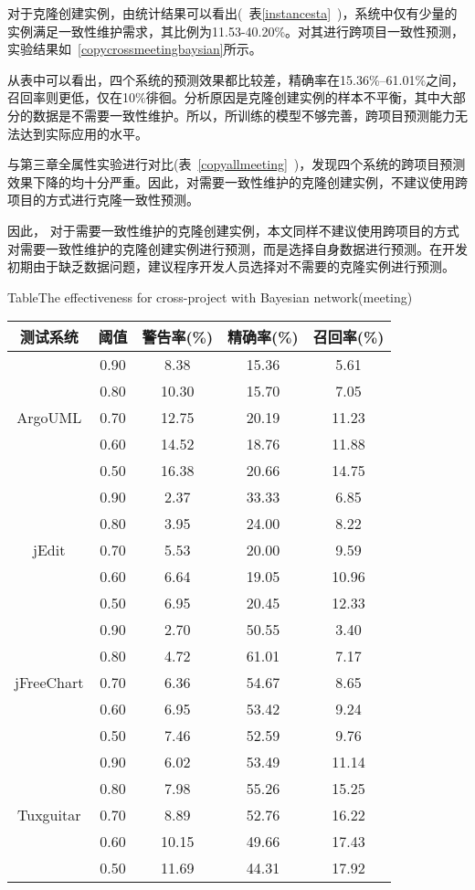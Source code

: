 对于克隆创建实例，由统计结果可以看出(~表\ref{instancesta}~)，系统中仅有少量的实例满足一致性维护需求，其比例为11.53-40.20\%。对其进行跨项目一致性预测，实验结果如~\ref{copycrossmeetingbaysian}所示。

从表中可以看出，四个系统的预测效果都比较差，精确率在15.36\%--61.01\%之间，召回率则更低，仅在10\%徘徊。分析原因是克隆创建实例的样本不平衡，其中大部分的数据是不需要一致性维护。所以，所训练的模型不够完善，跨项目预测能力无法达到实际应用的水平。

与第三章全属性实验进行对比(表~\ref{copyallmeeting}~)，发现四个系统的跨项目预测效果下降的均十分严重。因此，对需要一致性维护的克隆创建实例，不建议使用跨项目的方式进行克隆一致性预测。

因此， 对于需要一致性维护的克隆创建实例，本文同样不建议使用跨项目的方式对需要一致性维护的克隆创建实例进行预测，而是选择自身数据进行预测。在开发初期由于缺乏数据问题，建议程序开发人员选择对不需要的克隆实例进行预测。

\begin{table}[htbp]
{Table$\!$}{The effectiveness for cross-project with Bayesian network(meeting)}
\vspace{0.5em}
\centering
\wuhao
\begin{tabular}{ccccc}
\toprule[1.5pt]
{测试系统}&{阈值}&{警告率(\%)}&{精确率(\%)}&{召回率(\%)}\\
\midrule[1pt]
\multirow{5}{*}{ArgoUML}
&0.90&	8.38&	15.36&	5.61\\
&0.80&	10.30&	15.70&	7.05\\
&0.70&	12.75&	20.19&	11.23\\
&0.60&	14.52&	18.76&	11.88\\
&0.50&	16.38&	20.66&	14.75\\
\hline
\multirow{5}{*}{jEdit}
&0.90&	2.37&	33.33&	6.85\\
&0.80&	3.95&	24.00&	8.22\\
&0.70&	5.53&	20.00&	9.59\\
&0.60&	6.64&	19.05&	10.96\\
&0.50&	6.95&	20.45&	12.33\\
\hline
\multirow{5}{*}{jFreeChart}
&0.90&	2.70&	50.55&	3.40\\
&0.80&	4.72&	61.01&	7.17\\
&0.70&	6.36&	54.67&	8.65\\
&0.60&	6.95&	53.42&	9.24\\
&0.50&	7.46&	52.59&	9.76\\
\hline
\multirow{5}{*}{Tuxguitar}
&0.90&	6.02&	53.49&	11.14\\
&0.80&	7.98&	55.26&	15.25\\
&0.70&	8.89&	52.76&	16.22\\
&0.60&	10.15&	49.66&	17.43\\
&0.50&	11.69&	44.31&	17.92\\
\bottomrule[1.5pt]
\end{tabular}
\end{table}

